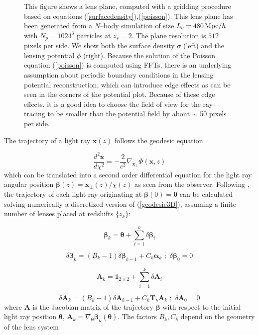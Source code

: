 \documentclass[5p]{elsarticle}
\newcommand{\bb}[1]{\mathbf{#1}}
\begin{document}
\begin{figure}
\begin{center}
\caption{This figure shows a lens plane, computed with a gridding procedure based on equations (\ref{surfacedensity}),(\ref{poisson}). This lens plane has been generated from a $N$--body simulation of size $L_b=480\,{\rm Mpc}/h$ with $N_p=1024^3$ particles at $z_s=2$. The plane resolution is $512\,\,$pixels per side. We show both the surface density $\sigma$ (left) and the lensing potential $\phi$ (right). Because the solution of the Poisson equation (\ref{poisson}) is computed using FFTs, there is an underlying assumption about periodic boundary conditions in the lensing potential reconstruction, which can introduce edge effects as can be seen in the corners of the potential plot. Because of these edge effects, it is a good idea to choose the field of view for the ray--tracing to be smaller than the potential field by about $\sim$ 50 pixels per side.}
\label{lensplanefig}
\end{center}
\end{figure}
%
The trajectory of a light ray $\bb{x}(z)$ follows the geodesic equation

\begin{equation}
\label{geodesic3D}
\frac{d^2\bb{x}}{d\chi^2} = -\frac{2}{c^2}\nabla_\bb{x_\perp}\Phi(\bb{x},z)
\end{equation}
%
which can be translated into a second order differential equation for the light ray angular position $\pmb{\beta}(z)=\bb{x}_\perp(z)/\chi(z)$ as seen from the observer. Following \citep{RayTracingHartlap}, the trajectory of each light ray originating at $\pmb{\beta}(0)=\pmb{\theta}$ can be calculated solving numerically a discretized version of (\ref{geodesic3D}), assuming a finite number of lenses placed at redshifts $\{z_k\}$:
%

\begin{equation}
\label{geodesic2D}
\pmb{\beta}_{k} = \pmb{\theta} + \sum_{i=1}^k\delta\pmb{\beta}_i 
\end{equation}

\begin{equation}
\label{deflections}
\delta\pmb{\beta}_k = (B_k-1)\delta\pmb{\beta}_{k-1} + C_k\pmb{\alpha}_k \,\, ; \,\, \delta\pmb{\beta}_0=0
\end{equation}

\begin{equation}
\label{jacobian}
\bb{A}_{k} = \mathds{1}_{2\times2} + \sum_{i=1}^k\delta\bb{A}_i 
\end{equation}

\begin{equation}
\label{sheartensorproduct}
\delta\bb{A}_k = (B_k-1)\delta\bb{A}_{k-1} + C_k\bb{T}_k\bb{A}_k \,\, ; \,\, \delta\bb{A}_0=0
\end{equation}
%
where $\bb{A}$ is the Jacobian matrix of the trajectory $\pmb{\beta}$ with respect to the initial light ray position $\pmb{\theta}$, $\bb{A}_k=\nabla_{\pmb{\theta}}\pmb{\beta}_k(\pmb{\theta})$. The factors $B_k,C_k$ depend on the geometry of the lens system
\end{document}
